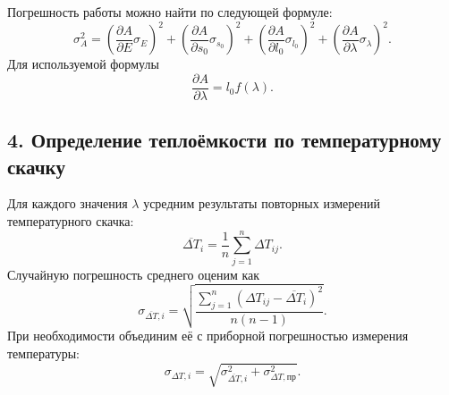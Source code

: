\documentclass[12pt,a4paper]{article}
\numberwithin{equation}{section}
\newcommand{\compactTableStyle}{%
    \footnotesize
    \renewcommand{\arraystretch}{1.15}%
}
\begin{document}
Погрешность работы можно найти по следующей формуле:
\[
    \sigma_A^2
    =
    \left(\frac{\partial A}{\partial E}\sigma_E\right)^2+
    \left(\frac{\partial A}{\partial s_0}\sigma_{s_0}\right)^2+
    \left(\frac{\partial A}{\partial l_0}\sigma_{l_0}\right)^2+
    \left(\frac{\partial A}{\partial \lambda}\sigma_\lambda\right)^2.
\]
Для используемой формулы
\[
    \frac{\partial A}{\partial\lambda}=l_0f(\lambda).
\]

\subsection*{4. Определение теплоёмкости по температурному скачку}

Для каждого значения $\lambda$ усредним результаты повторных измерений температурного скачка:
\[
    \overline{\Delta T}_i
    =
    \frac{1}{n}
    \sum_{j=1}^{n}\Delta T_{ij}.
\]
Случайную погрешность среднего оценим как
\[
    \sigma_{\overline{\Delta T},i}
    =
    \sqrt{
        \frac{
            \sum_{j=1}^{n}
            \left(\Delta T_{ij}-\overline{\Delta T}_i\right)^2
        }{n(n-1)}
    }.
\]
При необходимости объединим её с приборной погрешностью измерения температуры:
\[
    \sigma_{\Delta T,i}
    =
    \sqrt{
        \sigma_{\overline{\Delta T},i}^2+
        \sigma_{\Delta T,\text{пр}}^2
    }.
\]

\begin{table}[H]
    \centering
    \caption{Температурный эффект адиабатического растяжения}
    \compactTableStyle
\end{table}
\end{document}
